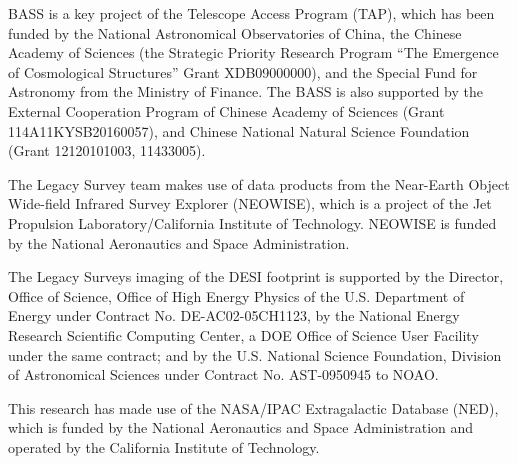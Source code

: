 \documentclass[twocolumn]{aastex631}
\begin{document}
BASS is a key project of the Telescope Access Program (TAP), which has been funded by the National Astronomical Observatories of China, the Chinese Academy of Sciences (the Strategic Priority Research Program “The Emergence of Cosmological Structures” Grant XDB09000000), and the Special Fund for Astronomy from the Ministry of Finance. The BASS is also supported by the External Cooperation Program of Chinese Academy of Sciences (Grant  114A11KYSB20160057), and Chinese National Natural Science Foundation (Grant  12120101003, 11433005).

The Legacy Survey team makes use of data products from the Near-Earth Object Wide-field Infrared Survey Explorer (NEOWISE), which is a project of the Jet Propulsion Laboratory/California Institute of Technology. NEOWISE is funded by the National Aeronautics and Space Administration.

The Legacy Surveys imaging of the DESI footprint is supported by the Director, Office of Science, Office of High Energy Physics of the U.S. Department of Energy under Contract No. DE-AC02-05CH1123, by the National Energy Research Scientific Computing Center, a DOE Office of Science User Facility under the same contract; and by the U.S. National Science Foundation, Division of Astronomical Sciences under Contract No. AST-0950945 to NOAO.

This research has made use of the NASA/IPAC Extragalactic Database (NED), which is funded by the National Aeronautics and Space Administration and operated by the California Institute of Technology.


\end{document}
